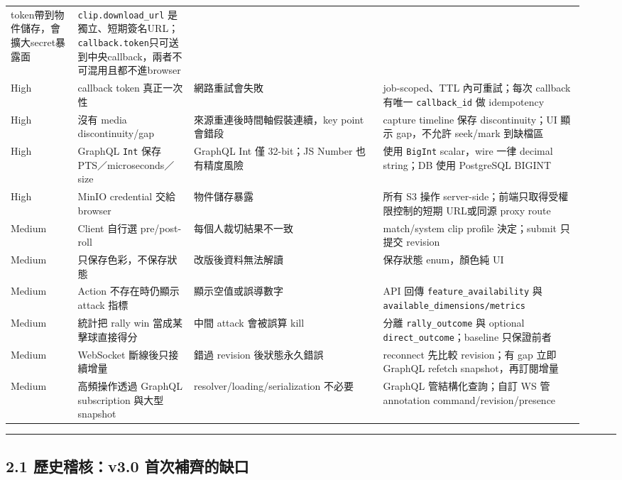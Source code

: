 \documentclass[
  9pt,
  a4paper,
]{article}
\begin{document}
\begin{longtable}[]{@{}>{\RaggedRight\arraybackslash}p{0.11\linewidth}>{\RaggedRight\arraybackslash}p{0.19\linewidth}>{\RaggedRight\arraybackslash}p{0.31\linewidth}>{\RaggedRight\arraybackslash}p{0.33\linewidth}@{}}
token帶到物件儲存，會擴大secret暴露面 & \texttt{clip.download\_\allowbreak{}url}
是獨立、短期簽名URL；\texttt{callback.token}只可送到中央callback，兩者不可混用且都不進browser \\
High & callback token 真正一次性 & 網路重試會失敗 & job-scoped、TTL
內可重試；每次 callback 有唯一 \texttt{callback\_\allowbreak{}id} 做 idempotency \\
High & 沒有 media discontinuity/gap & 來源重連後時間軸假裝連續，key
point 會錯段 & capture timeline 保存 discontinuity；UI 顯示 gap，不允許
seek/mark 到缺檔區 \\
High & GraphQL \texttt{Int} 保存 PTS／microseconds／size & GraphQL Int
僅 32-bit；JS Number 也有精度風險 & 使用 \texttt{BigInt} scalar，wire
一律 decimal string；DB 使用 PostgreSQL BIGINT \\
High & MinIO credential 交給 browser & 物件儲存暴露 & 所有 S3 操作
server-side；前端只取得受權限控制的短期 URL或同源 proxy route \\
Medium & Client 自行選 pre/post-roll & 每個人裁切結果不一致 &
match/system clip profile 決定；submit 只提交 revision \\
Medium & 只保存色彩，不保存狀態 & 改版後資料無法解讀 & 保存狀態
enum，顏色純 UI \\
Medium & Action 不存在時仍顯示 attack 指標 & 顯示空值或誤導數字 & API
回傳 \texttt{feature\_\allowbreak{}availability} 與
\texttt{available\_\allowbreak{}dimensions/metrics} \\
Medium & 統計把 rally win 當成某擊球直接得分 & 中間 attack 會被誤算 kill
& 分離 \texttt{rally\_\allowbreak{}outcome} 與 optional
\texttt{direct\_\allowbreak{}outcome}；baseline 只保證前者 \\
Medium & WebSocket 斷線後只接續增量 & 錯過 revision 後狀態永久錯誤 &
reconnect 先比較 revision；有 gap 立即 GraphQL refetch
snapshot，再訂閱增量 \\
Medium & 高頻操作透過 GraphQL subscription 與大型 snapshot &
resolver/loading/serialization 不必要 & GraphQL 管結構化查詢；自訂 WS 管
annotation command/revision/presence \\
\end{longtable}

\begin{center}\rule{0.5\linewidth}{0.5pt}\end{center}

\subsection{2.1 歷史稽核：v3.0
首次補齊的缺口}\label{21-ux6b77ux53f2ux7a3dux6838v30-ux9996ux6b21ux88dcux9f4aux7684ux7f3aux53e3}
\end{document}
